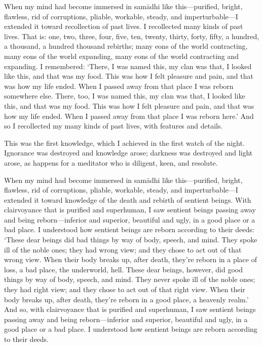 \documentclass[12pt,openany]{book}%
\begin{document}
When my mind had become immersed in \textsanskrit{samādhi} like this—purified, bright, flawless, rid of corruptions, pliable, workable, steady, and imperturbable—I extended it toward recollection of past lives. I recollected many kinds of past lives. That is: one, two, three, four, five, ten, twenty, thirty, forty, fifty, a hundred, a thousand, a hundred thousand rebirths; many eons of the world contracting, many eons of the world expanding, many eons of the world contracting and expanding. I remembered: ‘There, I was named this, my clan was that, I looked like this, and that was my food. This was how I felt pleasure and pain, and that was how my life ended. When I passed away from that place I was reborn somewhere else. There, too, I was named this, my clan was that, I looked like this, and that was my food. This was how I felt pleasure and pain, and that was how my life ended. When I passed away from that place I was reborn here.’ And so I recollected my many kinds of past lives, with features and details. 

This was the first knowledge, which I achieved in the first watch of the night. Ignorance was destroyed and knowledge arose; darkness was destroyed and light arose, as happens for a meditator who is diligent, keen, and resolute. 

When my mind had become immersed in \textsanskrit{samādhi} like this—purified, bright, flawless, rid of corruptions, pliable, workable, steady, and imperturbable—I extended it toward knowledge of the death and rebirth of sentient beings. With clairvoyance that is purified and superhuman, I saw sentient beings passing away and being reborn—inferior and superior, beautiful and ugly, in a good place or a bad place. I understood how sentient beings are reborn according to their deeds: ‘These dear beings did bad things by way of body, speech, and mind. They spoke ill of the noble ones; they had wrong view; and they chose to act out of that wrong view. When their body breaks up, after death, they’re reborn in a place of loss, a bad place, the underworld, hell. These dear beings, however, did good things by way of body, speech, and mind. They never spoke ill of the noble ones; they had right view; and they chose to act out of that right view. When their body breaks up, after death, they’re reborn in a good place, a heavenly realm.’ And so, with clairvoyance that is purified and superhuman, I saw sentient beings passing away and being reborn—inferior and superior, beautiful and ugly, in a good place or a bad place. I understood how sentient beings are reborn according to their deeds. 
\end{document}
